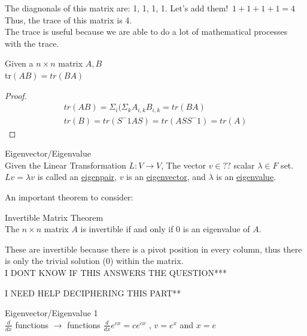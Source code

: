 The diagnonals of this matrix are: 1, 1, 1, 1. Let's add them!\
$1+1+1+1 = 4$ Thus, the trace of this matrix is 4. \\
The trace is useful because we are able to do a lot of mathematical processes with the trace. \\
\begin{proposition}
    Given a $n \times n$ matrix $A, B$ \\
    tr$(AB) = tr(BA)$
\end{proposition}
\begin{proof}
\begin{align*}
    tr(AB) = \Sigma_{i}(\Sigma_{k}A_{i,k}B_{i,k} = tr(BA) \\
    tr(B) = tr(S^-1AS) = tr(ASS^-1) = tr(A)
\end{align*}
    
\end{proof}
\begin{definition}{Eigenvector/Eigenvalue}\\
    Given the Linear Transformation $L : V \rightarrow V$, The vector $v \in ??$ scalar $\lambda \in F$ set. $Lv = \lambda v$ is called an \underline{eigenpair}, $v$ is an \underline{eigenvector}, and $\lambda$ is an \underline{eigenvalue}. 
    \end{definition}
An important theorem to consider: 
\begin{theorem}{Invertible Matrix Theorem}\\
    The $n \times n$ matrix $A$ is invertible if and only if 0 is an eigenvalue of $A$.
\end{theorem} 

    These are invertible because there is a pivot position in every column, thus there is only the trivial solution (0) within the matrix. \\ I DONT KNOW IF THIS ANSWERS THE QUESTION***


I NEED HELP DECIPHERING THIS PART**
\begin{exmp}{Eigenvector/Eigenvalue 1}\\
    $\frac{d}{dx}$ functions $\rightarrow$ functions
    $\frac{d}{dx}e^{cx}=ce^{cx}$ , $v = e^x$ and $x = e$
\end{exmp}

